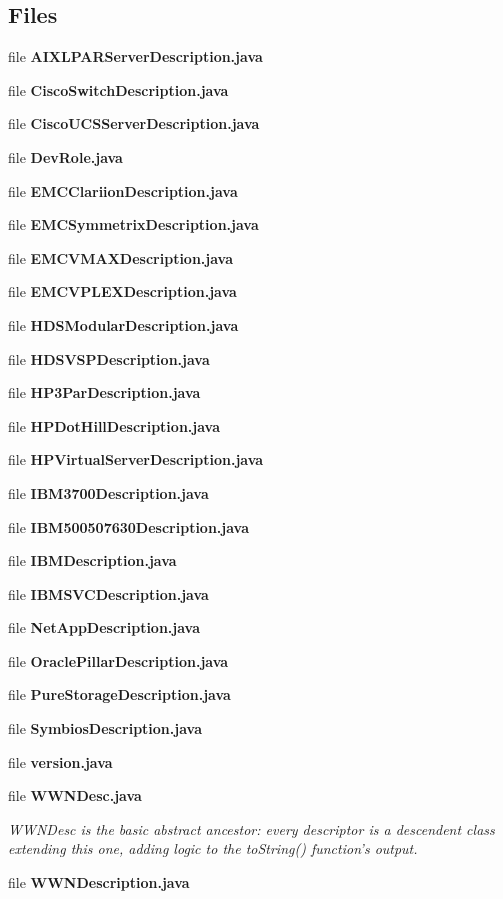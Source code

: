 \subsection*{Files}
\begin{DoxyCompactItemize}
\item 
file {\bfseries A\+I\+X\+L\+P\+A\+R\+Server\+Description.\+java}
\item 
file {\bfseries Cisco\+Switch\+Description.\+java}
\item 
file {\bfseries Cisco\+U\+C\+S\+Server\+Description.\+java}
\item 
file {\bf Dev\+Role.\+java}
\item 
file {\bf E\+M\+C\+Clariion\+Description.\+java}
\item 
file {\bf E\+M\+C\+Symmetrix\+Description.\+java}
\item 
file {\bf E\+M\+C\+V\+M\+A\+X\+Description.\+java}
\item 
file {\bf E\+M\+C\+V\+P\+L\+E\+X\+Description.\+java}
\item 
file {\bf H\+D\+S\+Modular\+Description.\+java}
\item 
file {\bf H\+D\+S\+V\+S\+P\+Description.\+java}
\item 
file {\bf H\+P3\+Par\+Description.\+java}
\item 
file {\bf H\+P\+Dot\+Hill\+Description.\+java}
\item 
file {\bfseries H\+P\+Virtual\+Server\+Description.\+java}
\item 
file {\bf I\+B\+M3700\+Description.\+java}
\item 
file {\bf I\+B\+M500507630\+Description.\+java}
\item 
file {\bf I\+B\+M\+Description.\+java}
\item 
file {\bf I\+B\+M\+S\+V\+C\+Description.\+java}
\item 
file {\bf Net\+App\+Description.\+java}
\item 
file {\bf Oracle\+Pillar\+Description.\+java}
\item 
file {\bfseries Pure\+Storage\+Description.\+java}
\item 
file {\bf Symbios\+Description.\+java}
\item 
file {\bf version.\+java}
\item 
file {\bf W\+W\+N\+Desc.\+java}
\begin{DoxyCompactList}\small\item\em W\+W\+N\+Desc is the basic abstract ancestor\+: every descriptor is a descendent class extending this one, adding logic to the to\+String() function's output. \end{DoxyCompactList}\item 
file {\bf W\+W\+N\+Description.\+java}
\end{DoxyCompactItemize}
